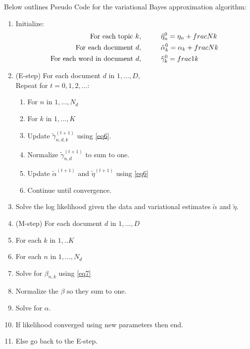 \documentclass[3p,times]{elsarticle}
\begin{document}
Below outlines Pseudo Code for the variational Bayes approximation algorithm:
\begin{enumerate}
	\item Initialize: \begin{align*}
						\text{For each topic } k, \hspace{10mm} &\tilde{\eta}^{0}_{n}=\eta_{n}+frac{N}{k} \\
						\text{For each document } d, \hspace{10mm}&\tilde{\alpha}^{0}_{k}=\alpha_{k}+frac{N}{k} \\
						\text{For each word in document } d, \hspace{10mm}&\tilde{\gamma}^{0}_{k}=frac{1}{k} \\
					\end{align*} 
	\item (E-step) For each document $d$ in $1,...,D$, \\ Repeat for $t=0,1,2,...$:
		\begin{enumerate}
			\item For $n$ in $1,...,N_{d}$
			\item \hspace{5mm} For $k$ in $1,...,K$ 
			\item \hspace{10mm} Update $\tilde{\gamma}^{(t+1)}_{n,d,k}$ using \ref{eq6}.
			\item \hspace{5mm} Normalize $\tilde{\gamma}^{(t+1)}_{n,d}$ to sum to one.
			\item Update $\tilde{\alpha}^{(t+1)}$ and $\tilde{\eta}^{(t+1)}$ using \ref{eq6}
			\item Continue until convergence.
		\end{enumerate}
	\item Solve the log likelihood given the data and variational estimates $\tilde{\alpha}$ and $\tilde{\eta}$.
	\item (M-step) For each document $d$ in $1,...,D$
	\item \hspace{5mm} For each $k$ in $1,..K$
	\item \hspace{10mm} For each $n$ in $1,...,N_{d}$
	\item \hspace{15mm} Solve for $\beta_{n,k}$ using \ref{eq7}
	\item \hspace{15mm} Normalize the $\beta$ so they sum to one.
	\item \hspace{5mm} Solve for $\alpha$.
	\item If likelihood converged using new parameters then end.
	\item Else go back to the E-step.
\end{enumerate}
\end{document}
